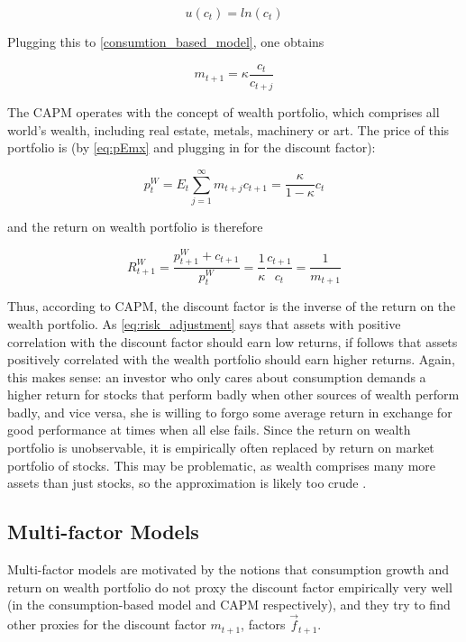 	 		\begin{equation}
	 			u(c_t) = ln(c_t)
	 		\end{equation}
	 		
	 		Plugging this to \ref{consumtion_based_model}, one obtains 
	 		
	 		\begin{equation}
	 			m_{t+1} = \kappa \frac{c_t}{c_{t+j}}
	 		\end{equation}
	 		
	 		The CAPM operates with the concept of wealth portfolio, which comprises all world's wealth, including real estate, metals, machinery or art. The price of this portfolio is (by \ref{eq:pEmx} and plugging in for the discount factor):  
	 		
	 		\begin{equation}
	 		p_t^W  = E_t \sum_{j=1}^{\infty} m_{t+j}c_{t+1} = \frac{\kappa}{1-\kappa}c_t
	 		\end{equation}
	 		
	 		and the return on wealth portfolio is therefore 
	 		
	 		\begin{equation}
	 		R_{t+1}^W  = \frac{p_{t+1}^W + c_{t+1}}{p_t^W} = \frac{1}{\kappa} \frac{c_{t+1}}{c_t} = \frac{1}{m_{t+1}}
	 		\end{equation}
	 		
	 		Thus, according to CAPM, the discount factor is the inverse of the return on the wealth portfolio. As \ref{eq:risk_adjustment} says that assets with positive correlation with the discount factor should earn low returns, if follows that assets positively correlated with the wealth portfolio should earn higher returns. Again, this makes sense: an investor who only cares about consumption demands a higher return for stocks that perform badly when other sources of wealth perform badly, and vice versa, she is willing to forgo some average return in exchange for good performance at times when all else fails. Since the return on wealth portfolio is unobservable, it is empirically often replaced by return on market portfolio of stocks. This may be problematic, as wealth comprises many more assets than just stocks, so the approximation is likely too crude \citep{roll1977critique}.  
	 		
	 		
	 	\subsection{Multi-factor Models}
	 		
	 		Multi-factor models are motivated by the notions that consumption growth and return on wealth portfolio do not proxy the discount factor empirically very well (in the consumption-based model and CAPM respectively), and they try to find other proxies for the discount factor $m_{t+1}$, factors $\vec{f}_{t+1}$. 
	 		
